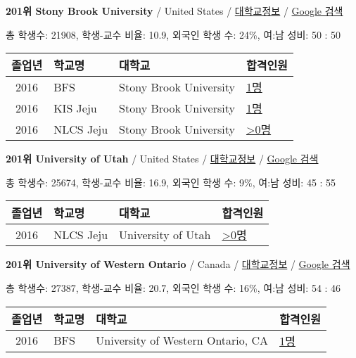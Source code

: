\documentclass[13pt,]{article}
\begin{document}
\textbf{201위 Stony Brook University} / United States /
\href{https://www.timeshighereducation.com/world-university-rankings/stony-brook-university?ranking-dataset=589595}{대학교정보}
/ \href{http://www.google.com/search?q=Stony+Brook+University}{Google
검색}

총 학생수: 21908, 학생-교수 비율: 10.9, 외국인 학생 수: 24\%, 여:남
성비: 50 : 50

\begin{longtable}[]{@{}clll@{}}
\toprule
졸업년 & 학교명 & 대학교 & 합격인원\tabularnewline
\midrule
\endhead
2016 & BFS & Stony Brook University &
\href{http://cafe.naver.com/assarabia/11597}{1명}\tabularnewline
2016 & KIS Jeju & Stony Brook University &
\href{http://cafe.naver.com/assarabia/11596}{1명}\tabularnewline
2016 & NLCS Jeju & Stony Brook University &
\href{http://cafe.naver.com/assarabia/11592}{\textgreater{}0명}\tabularnewline
\bottomrule
\end{longtable}

\textbf{201위 University of Utah} / United States /
\href{https://www.timeshighereducation.com/world-university-rankings/university-of-utah?ranking-dataset=589595}{대학교정보}
/ \href{http://www.google.com/search?q=University+of+Utah}{Google 검색}

총 학생수: 25674, 학생-교수 비율: 16.9, 외국인 학생 수: 9\%, 여:남 성비:
45 : 55

\begin{longtable}[]{@{}clll@{}}
\toprule
졸업년 & 학교명 & 대학교 & 합격인원\tabularnewline
\midrule
\endhead
2016 & NLCS Jeju & University of Utah &
\href{http://cafe.naver.com/assarabia/11592}{\textgreater{}0명}\tabularnewline
\bottomrule
\end{longtable}

\textbf{201위 University of Western Ontario} / Canada /
\href{https://www.timeshighereducation.com/world-university-rankings/university-of-western-ontario?ranking-dataset=589595}{대학교정보}
/
\href{http://www.google.com/search?q=University+of+Western+Ontario}{Google
검색}

총 학생수: 27387, 학생-교수 비율: 20.7, 외국인 학생 수: 16\%, 여:남
성비: 54 : 46

\begin{longtable}[]{@{}clll@{}}
\toprule
졸업년 & 학교명 & 대학교 & 합격인원\tabularnewline
\midrule
\endhead
2016 & BFS & University of Western Ontario, CA &
\href{http://cafe.naver.com/assarabia/11597}{1명}\tabularnewline
\bottomrule
\end{longtable}
\end{document}
